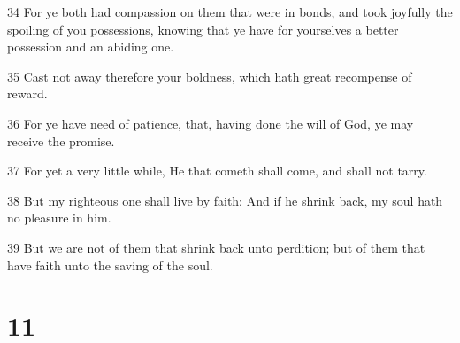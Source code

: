 \par 34 For ye both had compassion on them that were in bonds, and took joyfully the spoiling of you possessions, knowing that ye have for yourselves a better possession and an abiding one.
\par 35 Cast not away therefore your boldness, which hath great recompense of reward.
\par 36 For ye have need of patience, that, having done the will of God, ye may receive the promise.
\par 37 For yet a very little while, He that cometh shall come, and shall not tarry.
\par 38 But my righteous one shall live by faith: And if he shrink back, my soul hath no pleasure in him.
\par 39 But we are not of them that shrink back unto perdition; but of them that have faith unto the saving of the soul.

\chapter{11}

